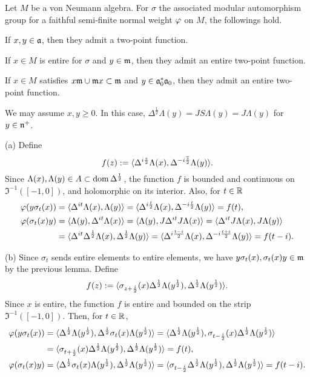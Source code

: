 \documentclass{../../small}
\begin{document}
\begin{lem}
Let $M$ be a von Neumann algebra.
For $\sigma$ the associated modular automorphism group for a faithful semi-finite normal weight $\varphi$ on $M$, the followings hold.
\begin{parts}
\item If $x,y\in\mathfrak{a}$, then they admit a two-point function.
\item If $x\in M$ is entire for $\sigma$ and $y\in\mathfrak{m}$, then they admit an entire two-point function.
\item If $x\in M$ satisfies $x\mathfrak{m}\cup\mathfrak{m} x\subset\mathfrak{m}$ and $y\in\mathfrak{a}_0^*\mathfrak{a}_0$, then they admit an entire two-point function.
\end{parts}
\end{lem}
\begin{pf}
We may assume $x,y\ge0$.
In this case, $\Delta^{\frac12}\Lambda(y)=JS\Lambda(y)=J\Lambda(y)$ for $y\in\mathfrak{n}^+$.

(a)
Define
\[f(z):=\langle\Delta^{i\frac z2}\Lambda(x),\Delta^{-i\frac{\overline z}2}\Lambda(y)\rangle.\]
Since $\Lambda(x),\Lambda(y)\in A\subset\operatorname{dom}\Delta^{\frac12}$, the function $f$ is bounded and continuous on $\Im^{-1}([-1,0])$, and holomorphic on its interior.
Also, for $t\in\mathbb{R}$
\begin{align*}
\varphi(y\sigma_t(x))
&=\langle\Delta^{it}\Lambda(x),\Lambda(y)\rangle
=\langle\Delta^{i\frac t2}\Lambda(x),\Delta^{-i\frac t2}\Lambda(y)\rangle
=f(t),\\
\varphi(\sigma_t(x)y)
&=\langle\Lambda(y),\Delta^{it}\Lambda(x)\rangle
=\langle\Lambda(y),J\Delta^{it}J\Lambda(x)\rangle
=\langle\Delta^{it}J\Lambda(x),J\Lambda(y)\rangle\\
&=\langle\Delta^{it}\Delta^{\frac12}\Lambda(x),\Delta^{\frac12}\Lambda(y)\rangle
=\langle\Delta^{i\frac{t-i}2}\Lambda(x),\Delta^{-i\frac{t+i}2}\Lambda(y)\rangle
=f(t-i).
\end{align*}

(b)
Since $\sigma_t$ sends entire elements to entire elements, we have $y\sigma_t(x),\sigma_t(x)y\in\mathfrak{m}$ by the previous lemma.
Define
\[f(z):=\langle\sigma_{z+\frac i2}(x)\Delta^{\frac12}\Lambda(y^{\frac12}),\Delta^{\frac12}\Lambda(y^{\frac12})\rangle.\]
Since $x$ is entire, the function $f$ is entire and bounded on the strip $\Im^{-1}([-1,0])$.
Then, for $t\in\mathbb{R}$,
\begin{align*}
\varphi(y\sigma_t(x))
&=\langle\Delta^{\frac12}\Lambda(y^{\frac12}),\Delta^{\frac12}\sigma_t(x)\Lambda(y^\frac12)\rangle
=\langle\Delta^{\frac12}\Lambda(y^{\frac12}),\sigma_{t-\frac i2}(x)\Delta^{\frac12}\Lambda(y^\frac12)\rangle\\
&=\langle\sigma_{t+\frac i2}(x)\Delta^{\frac12}\Lambda(y^{\frac12}),\Delta^{\frac12}\Lambda(y^\frac12)\rangle=f(t),\\
\varphi(\sigma_t(x)y)
&=\langle\Delta^{\frac12}\sigma_t(x)\Lambda(y^{\frac12}),\Delta^{\frac12}\Lambda(y^\frac12)\rangle
=\langle\sigma_{t-\frac i2}\Delta^{\frac12}\Lambda(y^{\frac12}),\Delta^{\frac12}\Lambda(y^\frac12)\rangle=f(t-i).
\end{align*}


\end{pf}
\end{document}
